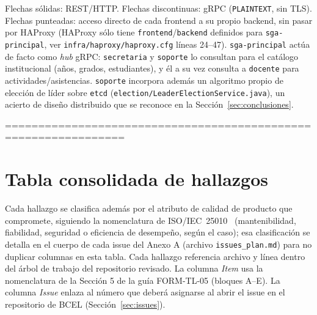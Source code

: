 \documentclass[11pt,a4paper]{article}
\begin{document}
\footnotesize
Flechas s\'olidas: REST/HTTP. Flechas discontinuas: gRPC (\texttt{PLAINTEXT}, sin TLS). Flechas punteadas: acceso directo de cada frontend a su propio backend, sin pasar por HAProxy (HAProxy s\'olo tiene \texttt{frontend}/\texttt{backend} definidos para \texttt{sga-principal}, ver \texttt{infra/haproxy/haproxy.cfg} l\'ineas 24--47). \texttt{sga-principal} act\'ua de facto como \emph{hub} gRPC: \texttt{secretaria} y \texttt{soporte} lo consultan para el cat\'alogo institucional (a\~nos, grados, estudiantes), y \'el a su vez consulta a \texttt{docente} para actividades/asistencias. \texttt{soporte} incorpora adem\'as un algoritmo propio de elecci\'on de l\'ider sobre \texttt{etcd} (\texttt{election/LeaderElectionService.java}), un acierto de dise\~no distribuido que se reconoce en la Secci\'on~\ref{sec:conclusiones}.
\normalsize

%
    ================================================================
    \section{Tabla consolidada de hallazgos}
    \label{sec:hallazgos}

    Cada hallazgo se clasifica adem\'as por el atributo de calidad de producto que compromete, siguiendo la nomenclatura de ISO/IEC~25010~\cite{iso25010} (mantenibilidad, fiabilidad, seguridad o eficiencia de desempe\~no, seg\'un el caso); esa clasificaci\'on se detalla en el cuerpo de cada issue del Anexo A (archivo \texttt{issues\_plan.md}) para no duplicar columnas en esta tabla. Cada hallazgo referencia archivo y l\'inea dentro del \'arbol de trabajo del repositorio revisado. La columna \emph{Item} usa la nomenclatura de la Secci\'on 5 de la gu\'ia FORM-TL-05 (bloques A--E). La columna \emph{Issue} enlaza al n\'umero que deber\'a asignarse al abrir el issue en el repositorio de BCEL (Secci\'on~\ref{sec:issues}).
\end{document}
